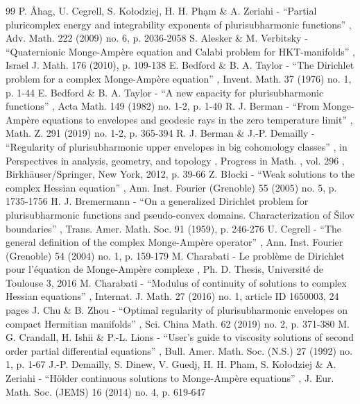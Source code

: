\documentclass[11pt]{article}
\numberwithin{equation}{section}
\theoremstyle{definition}
\theoremstyle{plain}
\theoremstyle{definition}
\begin{document}

\begin{thebibliography}{99}
 P. Åhag, U. Cegrell, S. Kołodziej, H. H. Phạm \& A. Zeriahi - “Partial pluricomplex energy and integrability exponents of plurisubharmonic functions” , Adv. Math. 222 (2009) no. 6, p. 2036-2058
 S. Alesker \& M. Verbitsky - “Quaternionic Monge-Ampère equation and Calabi problem for HKT-manifolds” , Israel J. Math. 176 (2010), p. 109-138
 E. Bedford \& B. A. Taylor - “The Dirichlet problem for a complex Monge-Ampère equation” , Invent. Math. 37 (1976) no. 1, p. 1-44
 E. Bedford \& B. A. Taylor - “A new capacity for plurisubharmonic functions” , Acta Math. 149 (1982) no. 1-2, p. 1-40
 R. J. Berman - “From Monge-Ampère equations to envelopes and geodesic rays in the zero temperature limit” , Math. Z. 291 (2019) no. 1-2, p. 365-394
 R. J. Berman \& J.-P. Demailly - “Regularity of plurisubharmonic upper envelopes in big cohomology classes” , in Perspectives in analysis, geometry, and topology , Progress in Math. , vol. 296 , Birkhäuser/Springer, New York, 2012, p. 39-66
 Z. Błocki - “Weak solutions to the complex Hessian equation” , Ann. Inst. Fourier (Grenoble) 55 (2005) no. 5, p. 1735-1756
 H. J. Bremermann - “On a generalized Dirichlet problem for plurisubharmonic functions and pseudo-convex domains. Characterization of Šilov boundaries” , Trans. Amer. Math. Soc. 91 (1959), p. 246-276
 U. Cegrell - “The general definition of the complex Monge-Ampère operator” , Ann. Inst. Fourier (Grenoble) 54 (2004) no. 1, p. 159-179
 M. Charabati - Le problème de Dirichlet pour l’équation de Monge-Ampère complexe , Ph. D. Thesis, Université de Toulouse 3, 2016
 M. Charabati - “Modulus of continuity of solutions to complex Hessian equations” , Internat. J. Math. 27 (2016) no. 1, article ID 1650003, 24 pages
 J. Chu \& B. Zhou - “Optimal regularity of plurisubharmonic envelopes on compact Hermitian manifolds” , Sci. China Math. 62 (2019) no. 2, p. 371-380
 M. G. Crandall, H. Ishii \& P.-L. Lions - “User’s guide to viscosity solutions of second order partial differential equations” , Bull. Amer. Math. Soc. (N.S.) 27 (1992) no. 1, p. 1-67
 J.-P. Demailly, S. Dinew, V. Guedj, H. H. Pham, S. Kołodziej \& A. Zeriahi - “Hölder continuous solutions to Monge-Ampère equations” , J. Eur. Math. Soc. (JEMS) 16 (2014) no. 4, p. 619-647

\end{thebibliography}
\end{document}
